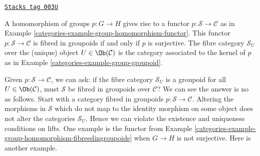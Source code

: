 \begin{example}
\label{categories-example-group-homomorphism-fibreedingroupoids}
\href{https://stacks.math.columbia.edu/tag/003U}{\texttt{Stacks tag 003U}}

A homomorphism of groups $p : G \to H$ gives rise to a functor
$p : \mathcal{S}\to\mathcal{C}$ as in Example
\ref{categories-example-group-homomorphism-functor}. This functor
$p : \mathcal{S}\to\mathcal{C}$ is fibred in groupoids if and only if
$p$ is surjective. The fibre category $\mathcal{S}_U$ over the (unique)
object $U\in \Ob(\mathcal{C})$ is the category associated to the
kernel of $p$ as in Example \ref{categories-example-group-groupoid}.
\end{example}

Given $p : \mathcal{S} \to \mathcal{C}$, we can ask: if the fibre
category $\mathcal{S}_U$ is a groupoid for all $U \in \Ob(\mathcal{C})$,
must $\mathcal{S}$ be fibred in groupoids over $\mathcal{C}$? We can see the
answer is no as follows. Start with a category fibred in groupoids
$p : \mathcal{S} \to \mathcal{C}$. Altering the morphisms in $\mathcal{S}$
which do not map to the identity morphism on some object does not alter the
categories $\mathcal{S}_U$. Hence we can violate the existence and uniqueness
conditions on lifts. One example is the functor from Example
\ref{categories-example-group-homomorphism-fibreedingroupoids} when $G \to H$ is not
surjective. Here is another example.

